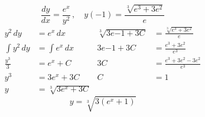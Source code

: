 \documentclass[12pt]{article}
\begin{document}
\begin{multicols}{2}
\begin{center}
    $$\frac{dy}{dx} = \frac{e^x}{y^2}\,, \quad y(-1) = \frac{\sqrt[3]{e^3 + 3e^2}}{e}$$
    \vspace*{-24pt}
    \begin{align*}
        y^2\,dy &= e^x\,dx & \sqrt[3]{3e{-1} + 3C} &= \frac{\sqrt[3]{e^3 + 3e^2}}{e} \\
        \int y^2\,dy &= \int e^x\,dx & 3e{-1} + 3C &= \frac{e^3 + 3e^2}{e^3}\\
        \frac{y^3}{3} &= e^x + C & 3C &= \frac{e^3 + 3e^2 - 3e^2}{e^3} \\
        y^3 &= 3e^x + 3C & C &= 1\\
        y &= \sqrt[3]{3e^x + 3C} 
    \end{align*}
    $$y = \sqrt[3]{3(e^x + 1)}$$ 
    \end{center}
    \vspace{64pt}
\end{multicols}
\end{document}
